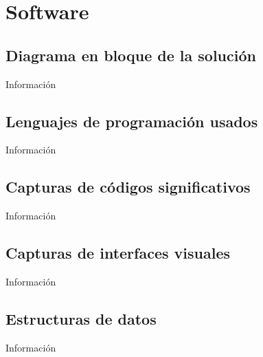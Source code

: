 \chapter{Software}

    \section{Diagrama en bloque de la solución}
        Información
    
    \section{Lenguajes de programación usados}
        Información
    
    \section{Capturas de códigos significativos}
        Información
    
    \section{Capturas de interfaces visuales}
        Información
    
    \section{Estructuras de datos}
        Información